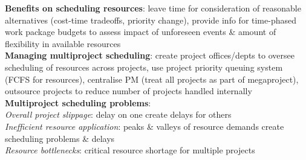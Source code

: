 \documentclass[a4paper]{article}
\begin{document}
\begin{multicols}{3}
        \textbf{Benefits on scheduling resources}: leave time for consideration of reasonable alternatives (cost-time tradeoffs, priority change), provide info for time-phased work package budgets to assess impact of unforeseen events \& amount of flexibility in available resources\\
        \textbf{Managing multiproject scheduling}: create project offices/depts to oversee scheduling of resources across projects, use project priority queuing system (FCFS for resources), centralise PM (treat all projects as part of megaproject), outsource projects to reduce number of projects handled internally\\
        \textbf{Multiproject scheduling problems}:\\
        \textit{Overall project slippage}: delay on one create delays for others\\
        \textit{Inefficient resource application}: peaks \& valleys of resource demands create scheduling problems \& delays\\
        \textit{Resource bottlenecks}: critical resource shortage for multiple projects\\
    \end{multicols}
    
\end{document}

